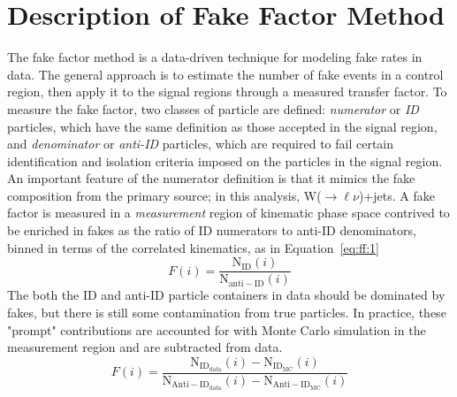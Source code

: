 \section{Description of Fake Factor Method}
\label{sec:FFdesc}
The fake factor method is a data-driven technique for modeling fake rates in data.  The general approach is to estimate the number of fake events in a control region, then apply it to the signal regions through a measured transfer factor.  To measure the fake factor, two classes of particle are defined: \textit{numerator} or \textit{ID} particles, which have the same definition as those accepted in the signal region, and \textit{denominator} or \textit{anti-ID} particles, which are required to fail certain identification and isolation criteria imposed on the particles in the signal region.  An important feature of the numerator definition is that it mimics the fake composition from the primary source; in this analysis, W($\rightarrow\ell\nu$)+jets.  A fake factor is measured in a \textit{measurement} region of kinematic phase space contrived to be enriched in fakes as the ratio of ID numerators to anti-ID denominators, binned in terms of the correlated kinematics, as in Equation~\ref{eq:ff:1}   
\begin{equation}
  F(i) = \frac{\mathrm{N_{ID}}(i)}{\mathrm{N_{anti-ID}}(i)}
  \label{eq:ff:1}
\end{equation}
The both the ID and anti-ID particle containers in data should be dominated by fakes, but there is still some contamination from true particles.  In practice, these "prompt" contributions are accounted for with Monte Carlo simulation in the measurement region and are subtracted from data.
\begin{equation}
  F(i) = \frac{\mathrm{N_{ID_{data}}}(i) - \mathrm{N_{ID_{MC}}}(i)}{\mathrm{N_{Anti-ID_{data}}}(i) - \mathrm{N_{Anti-ID_{MC}}}(i)}
  \label{eq:ff:2}
\end{equation}

